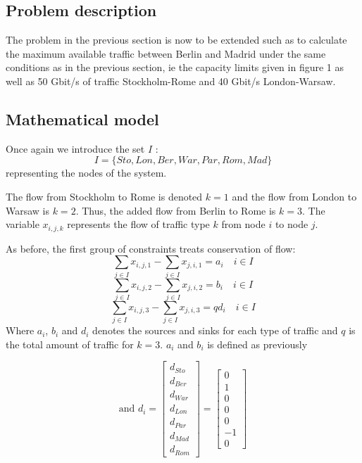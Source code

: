 \subsection{Problem description}

The problem in the previous section is now to be extended such as to calculate the maximum  available traffic between Berlin and Madrid under the same conditions as in the previous section, ie the capacity limits given in figure 1 as well as 50 Gbit/s of traffic Stockholm-Rome and 40 Gbit/s London-Warsaw. 

\subsection{Mathematical model}
Once again we introduce the set $I$ :
$$I = \{ Sto,Lon,Ber,War,Par,Rom,Mad\}$$
representing the nodes of the system.

The flow from Stockholm to Rome is denoted $k=1$ and the flow from London to Warsaw is $k=2$. Thus, the added flow from Berlin to Rome is $k=3$. The variable $x_{i,j,k}$ represents the flow of traffic type $k$ from node $i$ to node $j$.

As before, the first  group of constraints treats conservation of flow:
$$\sum\limits_{j \in I} x_{i,j,1} - \sum\limits_{j \in I} x_{j,i,1} = a_{i} \quad i \in I$$
$$\sum\limits_{j \in I} x_{i,j,2} - \sum\limits_{j \in I} x_{j,i,2} = b_{i} \quad i \in I$$
$$\sum\limits_{j \in I} x_{i,j,3} - \sum\limits_{j \in I} x_{j,i,3} = q d_{i} \quad i \in I$$
Where $a_i$, $b_i$ and $d_i$ denotes the sources and sinks for each type of traffic and $q$ is the total amount of traffic for $k=3$. $a_i$ and $b_i$ is defined as previously

$$
\text{and } d_{i} = 
 \begin{bmatrix}
  d_{Sto}\\
  d_{Ber}\\
  d_{War}\\
  d_{Lon}\\
  d_{Par}\\
  d_{Mad}\\
  d_{Rom}
 \end{bmatrix} =
 \begin{bmatrix}
  0\\
  1\\
  0\\
  0\\
  0\\
  -1\\
  0
 \end{bmatrix}
$$



